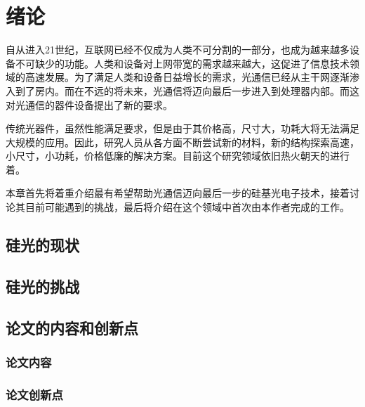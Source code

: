 \chapter{绪论}
自从进入21世纪，互联网已经不仅成为人类不可分割的一部分，也成为越来越多设备不可缺少的功能。人类和设备对上网带宽的需求越来越大，这促进了信息技术领域的高速发展。为了满足人类和设备日益增长的需求，光通信已经从主干网逐渐渗入到了房内。而在不远的将未来，光通信将迈向最后一步进入到处理器内部。而这对光通信的器件设备提出了新的要求。


传统光器件，虽然性能满足要求，但是由于其价格高，尺寸大，功耗大将无法满足大规模的应用。因此，研究人员从各方面不断尝试新的材料，新的结构探索高速，小尺寸，小功耗，价格低廉的解决方案。目前这个研究领域依旧热火朝天的进行着。

本章首先将着重介绍最有希望帮助光通信迈向最后一步的硅基光电子技术，接着讨论其目前可能遇到的挑战，最后将介绍在这个领域中首次由本作者完成的工作。


\section{硅光的现状}

\section{硅光的挑战}

\section{论文的内容和创新点}

\subsection{论文内容}
\subsection{论文创新点}


